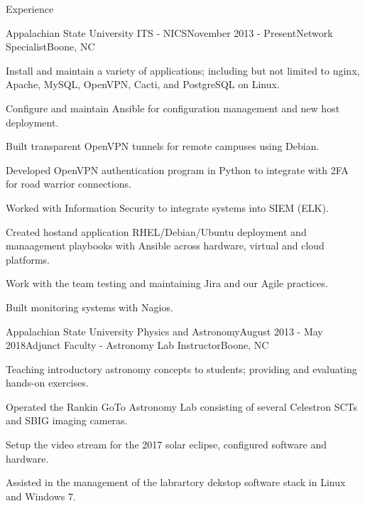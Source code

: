 \documentclass{cv} %
\begin{document}

\begin{rSection}{Experience}

\begin{rSubsection}{Appalachian State University ITS - NICS}{November 2013 - Present}{Network Specialist}{Boone, NC}
\item Install and maintain a variety of applications; including but not limited to nginx, Apache, MySQL, OpenVPN, Cacti, and PostgreSQL on Linux.
\item Configure and maintain Ansible for configuration management and new host deployment.
\item Built transparent OpenVPN tunnels for remote campuses using Debian.
\item Developed OpenVPN authentication program in Python to integrate with 2FA for road warrior connections.
\item Worked with Information Security to integrate systems into SIEM (ELK).
\item Created hostand application RHEL/Debian/Ubuntu deployment and manaagement playbooks with Ansible across hardware, virtual and cloud platforms. 
\item Work with the team testing and maintaining Jira and our Agile practices.
\item Built monitoring systems with Nagios.

\end{rSubsection}

\begin{rSubsection}{Appalachian State University Physics and Astronomy}{August 2013 - May 2018}{Adjunct Faculty - Astronomy Lab Instructor}{Boone, NC}
\item Teaching introductory astronomy concepts to students; providing and evaluating hands-on exercises.
\item Operated the Rankin GoTo Astronomy Lab consisting of several Celestron SCTs and SBIG imaging cameras.
\item Setup the video stream for the 2017 solar eclipse, configured software and hardware.
\item Assisted in the management of the labrartory dekstop software stack in Linux and Windows 7.
\end{rSubsection}


\end{rSection}
\end{document}
